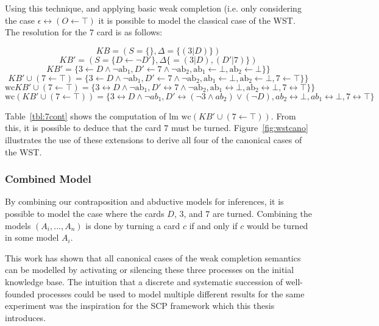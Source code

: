 Using this technique, and applying basic weak completion (i.e. only considering the case $\epsilon\leftrightarrow(O\leftarrow \top)$ it is possible to model the classical case of the WST. The resolution for the $7$ card is as follows:

\[
KB = (S=\{\},\Delta=\{(3|D)\})
\]
\[
KB' = (S=\{D \leftarrow  \lnot D'\},\Delta\{=(3|D),(D'|7)\})
\]
\[
KB' = \{3 \leftarrow D \land \lnot \text{ab}_1, D' \leftarrow 7 \land \lnot \text{ab}_2, \text{ab}_1 \leftarrow \bot, \text{ab}_2 \leftarrow \bot\}\}
\]
\[
KB'\cup (7\leftarrow\top) = \{3 \leftarrow D \land \lnot \text{ab}_1, D' \leftarrow 7 \land \lnot \text{ab}_2, \text{ab}_1 \leftarrow \bot, \text{ab}_2 \leftarrow \bot, 7 \leftarrow \top\}\}
\]
\[
\text{wc}KB'\cup (7\leftarrow\top) = \{3 \leftrightarrow D \land \lnot \text{ab}_1, D' \leftrightarrow 7 \land \lnot \text{ab}_2, \text{ab}_1 \leftrightarrow \bot, \text{ab}_2 \leftrightarrow \bot, 7 \leftrightarrow \top\}\}
\]
\begin{equation} \label{eqn:wst_contra}
\textrm{wc} (KB'\cup (7\leftarrow\top)) = \{3 \leftrightarrow D \land \lnot ab_1, D' \leftrightarrow (\lnot 3 \land ab_2) \lor (\lnot D),  ab_2\leftrightarrow \bot, ab_1\leftrightarrow \bot, 7\leftrightarrow\top \}
\end{equation}

Table~\ref{tbl:7cont} shows the computation of $\textrm{lm wc} (KB'\cup (7\leftarrow\top))$. From this, it is possible to deduce that the card $7$ must be turned. Figure~\ref{fig:wstcano} illustrates the use of these extensions to derive all four of the canonical cases of the WST.

 
\subsubsection*{Combined Model}
By combining our contraposition and abductive models for inferences, it is possible to model the case where the cards $D$, $3$, and $7$ are turned. Combining the models $(A_i,...,A_n)$ is done by turning a card $c$ if and only if $c$ would be turned in some model $A_i$.

This work has shown that all canonical cases of the weak completion semantics can be modelled by activating or silencing these three processes on the initial knowledge base. The intuition that a discrete and systematic succession of well-founded processes could be used to model multiple different results for the same experiment was the inspiration for the SCP framework which this thesis introduces.


